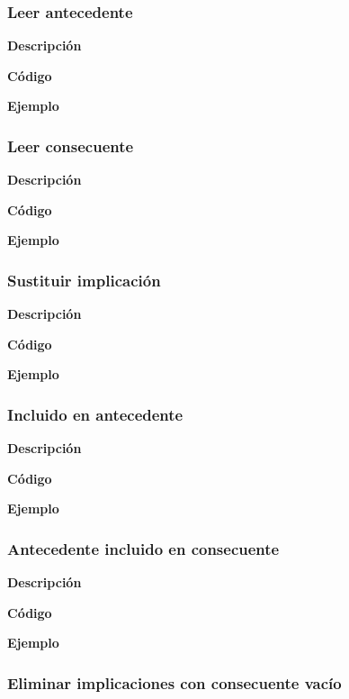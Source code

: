\subsubsection{Leer antecedente}

    \textbf{Descripci\'on}


    \textbf{C\'odigo}


    \textbf{Ejemplo}


\subsubsection{Leer consecuente}

    \textbf{Descripci\'on}


    \textbf{C\'odigo}


    \textbf{Ejemplo}


\subsubsection{Sustituir implicaci\'on}

    \textbf{Descripci\'on}


    \textbf{C\'odigo}


    \textbf{Ejemplo}


\subsubsection{Incluido en antecedente}

    \textbf{Descripci\'on}


    \textbf{C\'odigo}


    \textbf{Ejemplo}



\subsubsection{Antecedente incluido en consecuente}

    \textbf{Descripci\'on}


    \textbf{C\'odigo}


    \textbf{Ejemplo}


\subsubsection{Eliminar implicaciones con consecuente vac\'io}

